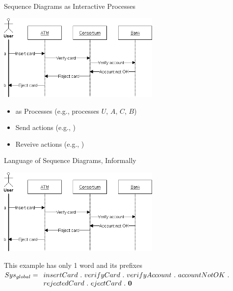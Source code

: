 \documentclass[aspectratio=169]{beamer}
\begin{document}
\begin{slide}{Sequence Diagrams as Interactive Processes}
  \centering

  \includegraphics[width=0.6\textwidth]{images/sd-simple-atm.png}

  \begin{itemize}
    \item {} as \alert{Processes}
    (e.g., processes $U$, $A$, $C$, $B$)
    \item \alert{Send} actions (e.g., )
    \item \alert{Reveive} actions (e.g., )
    
  \end{itemize}
\end{slide}

\begin{slide}{Language of Sequence Diagrams, Informally}
  \centering

  \includegraphics[width=0.6\textwidth]{images/sd-simple-atm.png}

  \begin{exampleblock}{This example has only 1 word and its prefixes}
   $Sys_{global}= \begin{array}[t]{l}
      insertCard ~.~ verifyCard ~.~ verifyAccount ~.~ accountNotOK ~.~ \\ rejectedCard ~.~ ejectCard ~.~ \mathbf{0}
      \end{array}$
  \end{exampleblock}
\end{slide}
\end{document}
